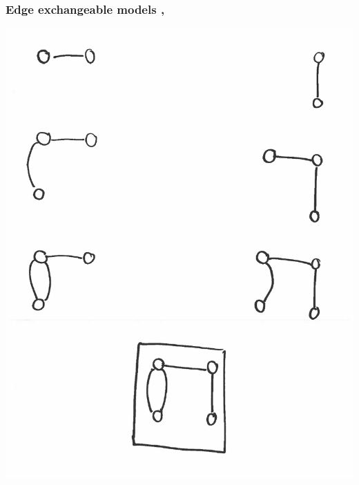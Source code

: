 \documentclass[final,hyperref={pdfpagelabels=false},noamsthm]{beamer}
\begin{document}
\begin{frame}
	\frametitle{Edge exchangeable models \cite{cai2016}, \cite{CraneDempsey2017}}
	\includegraphics[angle=90,origin=c,scale=0.4]{fig/ee3}
\end{frame}
\end{document}
